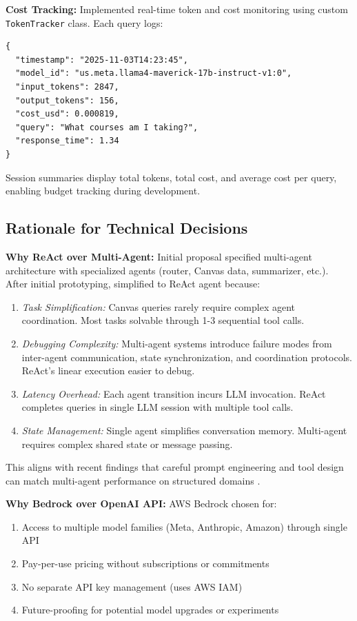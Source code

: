 \documentclass{article}
\begin{document}
\textbf{Cost Tracking:} Implemented real-time token and cost monitoring using custom \texttt{TokenTracker} class. Each query logs:

\begin{verbatim}
{
  "timestamp": "2025-11-03T14:23:45",
  "model_id": "us.meta.llama4-maverick-17b-instruct-v1:0",
  "input_tokens": 2847,
  "output_tokens": 156,
  "cost_usd": 0.000819,
  "query": "What courses am I taking?",
  "response_time": 1.34
}
\end{verbatim}

Session summaries display total tokens, total cost, and average cost per query, enabling budget tracking during development.

\subsection{Rationale for Technical Decisions}

\textbf{Why ReAct over Multi-Agent:} Initial proposal specified multi-agent architecture with specialized agents (router, Canvas data, summarizer, etc.). After initial prototyping, simplified to ReAct agent because:

\begin{enumerate}
    \item \textit{Task Simplification:} Canvas queries rarely require complex agent coordination. Most tasks solvable through 1-3 sequential tool calls.
    \item \textit{Debugging Complexity:} Multi-agent systems introduce failure modes from inter-agent communication, state synchronization, and coordination protocols. ReAct's linear execution easier to debug.
    \item \textit{Latency Overhead:} Each agent transition incurs LLM invocation. ReAct completes queries in single LLM session with multiple tool calls.
    \item \textit{State Management:} Single agent simplifies conversation memory. Multi-agent requires complex shared state or message passing.
\end{enumerate}

This aligns with recent findings that careful prompt engineering and tool design can match multi-agent performance on structured domains \cite{chen2024llmma}.

\textbf{Why Bedrock over OpenAI API:} AWS Bedrock chosen for:

\begin{enumerate}
    \item Access to multiple model families (Meta, Anthropic, Amazon) through single API
    \item Pay-per-use pricing without subscriptions or commitments
    \item No separate API key management (uses AWS IAM)
    \item Future-proofing for potential model upgrades or experiments
\end{enumerate}
\end{document}
